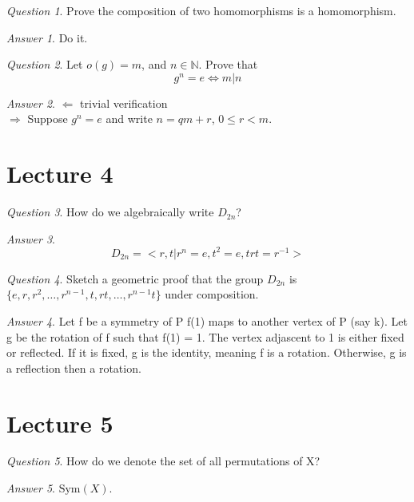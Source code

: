 \documentclass[]{article}
\def\naturals{\mathbb{N}}
\theoremstyle{remark}
\theoremstyle{qnstyle}
\newtheorem{question}{Question}
\theoremstyle{answerstyle}
\newtheorem*{answer}{Answer}
\begin{document}
\begin{question}
    Prove the composition of two homomorphisms is a homomorphism.
\end{question}
\begin{answer}
    Do it.
\end{answer}

\begin{question}
    Let $o(g) = m$, and $n \in \naturals$. Prove that
        $$g^n = e \iff m | n$$
\end{question}
\begin{answer}
    $\Leftarrow$ trivial verification \\
    $\Rightarrow$ Suppose $g^n = e$ and write $n = qm+r$, $0 \leq r < m$.
\end{answer}






\section* {Lecture 4}
\begin{question}
    How do we algebraically write $D_{2n}$?
\end{question}
\begin{answer}
    $$D_{2n} = <r,t \vert r^n =e, t^2 = e, trt = r^{-1}>$$
\end{answer}

\begin{question}
    Sketch a geometric proof that the group
    $D_{2n}$ is $\{e, r, r^2, \ldots, r^{n-1},t, rt, \ldots, r^{n-1}t \}$ 
    under composition.
\end{question}
\begin{answer}
    Let f be a symmetry of P
    f(1) maps to another vertex of P (say k).
    Let g be the rotation of f such that f(1) = 1.
    The vertex adjascent to 1 is either fixed or reflected.
    If it is fixed, g is the identity, meaning f is a rotation.
    Otherwise, g is a reflection then a rotation.
\end{answer}





\section* {Lecture 5}

\begin{question}
    How do we denote the set of all permutations of X?
\end{question}
\begin{answer}
    $\text{Sym}(X)$.
\end{answer}
\end{document}
